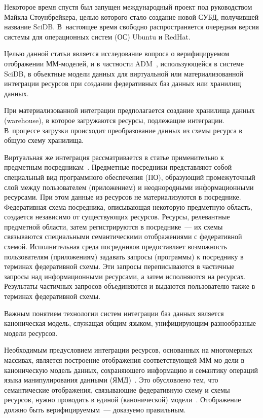 \begin{multicols}{2}
        Некоторое время спустя был запущен международный проект под 
руководством Майкла Стоунбрейкера, целью которого стало создание новой 
СУБД, получившей название SciDB. В~настоящее 
время свободно распространяется очередная версия системы для операционных
сис\-тем (ОС) Ubuntu и  RedHat.
        
        Целью данной статьи является исследование вопроса о верифицируемом 
отображении ММ-мо\-де\-лей, и в частности ADM~\cite{9-stu}, 
использующейся в системе SciDB, в объектные 
модели данных для виртуальной или материализованной интеграции ресурсов 
при создании федеративных баз данных или хранилищ данных. 
        
        При материализованной интеграции предполагается создание 
хранилища данных (warehouse), в которое загружаются ресурсы, подлежащие 
интеграции. В~процессе загрузки происходит преобразование данных из схемы 
ресурса в общую схему хранилища.
        
        Виртуальная же интеграция рассматривается в статье применительно к 
предметным посредникам~\cite{10-stu}. Предметные посредники представляют 
собой специальный вид программного обеспечения (ПО), образующий 
промежуточный слой между пользователем (приложением) и неоднородными 
информационными ресурсами. При этом данные из ресурсов не 
материализуются в посреднике. Федеративная схема посредника, описывающая 
некоторую предметную область, создается независимо от существующих 
ресурсов. Ресурсы, релевантные предметной области, затем регистрируются в 
посреднике~--- их схемы связываются специальными семантическими 
отображениями с федеративной схемой. Исполнительная среда посредников 
предо\-став\-ля\-ет возможность пользователям (приложениям) задавать запросы 
(программы) к посреднику в терминах федеративной схемы. Эти запросы 
переписываются в частичные запросы над информационными ресурсами, а 
затем исполняются на ресурсах. Результаты частичных запросов объединяются 
и выдаются пользователю также в терминах федеративной схемы.
        
        Важным понятием технологии систем интеграции баз данных является 
каноническая модель, служащая общим языком, унифицирующим 
разнообразные модели ресурсов.
        
        Необходимым предусловием интеграции ресурсов, основанных на 
многомерных массивах, является построение отображения соответствующей\linebreak 
ММ-мо-де\-ли в каноническую модель данных, сохраняющего информацию и 
семантику операций языка манипулирования данными (ЯМД)~\cite{11-stu}. 
Это обусловлено тем, что семантические отображения, связывающие 
федеративную схему и схемы ресурсов, нужно проводить в единой 
(канонической) модели~\cite{12-stu}. Отображение должно быть 
верифицируемым~--- доказуемо правильным. 
        

\end{multicols}
